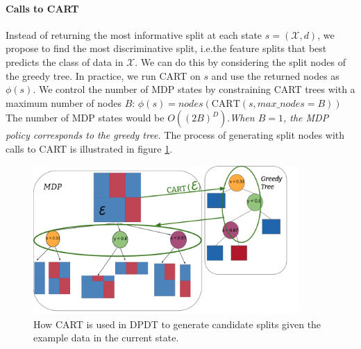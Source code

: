 \paragraph{Calls to CART}\label{cart-heuristic} Instead of returning the most informative split at each state $s=(\mathcal{X},d)$, we propose to find the most discriminative split, i.e.\@ the feature splits that best predicts the class of data in $\mathcal{X}$.
We can do this by considering the split nodes of the greedy tree. In practice, we run CART on $s$ and use the returned nodes as $\phi(s)$. We control the number of MDP states by constraining CART trees with a maximum number of nodes $B$: $\phi(s) = nodes(\text{CART}(s, max\_nodes=B))$
The number of MDP states would be $O({(2B)}^D)$.\textit{When $B=1$, the MDP policy corresponds to the greedy tree.} The process of generating split nodes with calls to CART is illustrated in figure \ref{fig:schema-dpdt}.

\begin{figure}
      \centering
      \includegraphics[trim={0 0cm 0 0},clip,width=0.9\textwidth]{images/figures/schematic_cart_node_select.pdf}
      \caption{How CART is used in DPDT to generate candidate splits given the example data in the current state.}\label{fig:schema-dpdt}
\end{figure}



